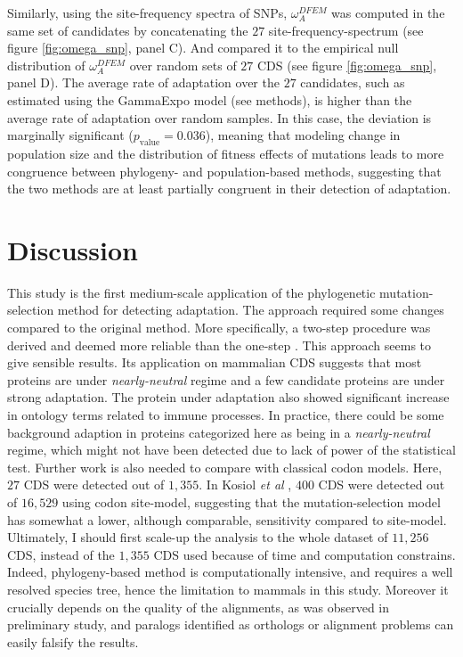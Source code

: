 \documentclass[10pt]{article}
\begin{document}
\begin{multicols}{2}
	Similarly, using the site-frequency spectra of SNPs, $\omega_A^{DFEM}$ was computed in the same set of candidates by concatenating the $27$ site-frequency-spectrum (see figure \ref{fig:omega_snp}, panel C). And compared it to the empirical null distribution of $\omega_A^{DFEM}$ over random sets of $27$ CDS (see figure \ref{fig:omega_snp}, panel D).
	The average rate of adaptation over the $27$ candidates, such as estimated using the GammaExpo model (see methods), is higher than the average rate of adaptation over random samples. In this case, the deviation is marginally significant ($p_{\mathrm{value}}=0.036$), 
	meaning that modeling change in population size and the distribution of fitness effects of mutations leads to more congruence between phylogeny- and population-based methods, suggesting that the two methods are at least partially congruent in their detection of adaptation.
	
	\section*{Discussion}


	This study is the first medium-scale application of the phylogenetic mutation-selection method for detecting adaptation. The approach required some changes compared to the original method. More specifically, a two-step procedure was derived and deemed more reliable than the one-step \cite{lartillot_phylobayes_2013}. This approach seems to give sensible results. Its application on mammalian CDS suggests that most proteins are under \textit{nearly-neutral} regime and a few candidate proteins are under strong adaptation. The protein under adaptation also showed significant increase in ontology terms related to immune processes. In practice, there could be some background adaption in proteins categorized here as being in a \textit{nearly-neutral} regime, which might not have been detected due to lack of power of the statistical test. Further work is also needed to compare with classical codon models. Here, $27$ CDS were detected out of $1,355$. In Kosiol \textit{et al} \cite{kosiol_patterns_2008}, $400$ CDS were detected out of $16,529$ using codon site-model, suggesting that the mutation-selection model has somewhat a lower, although comparable, sensitivity compared to site-model. Ultimately, I should first scale-up the analysis to the whole dataset of $11,256$ CDS, instead of the $1,355$ CDS used because of time and computation constrains. Indeed, phylogeny-based method is computationally intensive, and requires a well resolved species tree, hence the limitation to mammals in this study. Moreover it crucially depends on the quality of the alignments, as was observed in preliminary study, and paralogs identified as orthologs or alignment problems can easily falsify the results.\\
	

\end{multicols}
\end{document}
